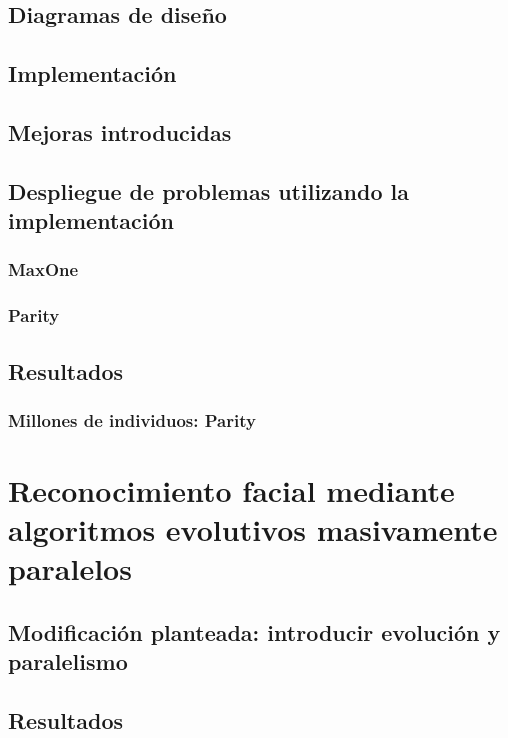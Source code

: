 \documentclass{estilos-y-libreria}
\begin{document}
	\section{Diagramas de dise\~no}
		
	\section{Implementaci\'on}
		
	\section{Mejoras introducidas}
		
	\section{Despliegue de problemas utilizando la implementaci\'on}
		
		\subsection{MaxOne}
			
		\subsection{Parity}
			
	\section{Resultados}
			
		\subsection{Millones de individuos: Parity}
				
			
\chapter{Reconocimiento facial mediante algoritmos evolutivos masivamente paralelos}		
	
	\section{Modificación planteada: introducir evolución y paralelismo}
		
	\section{Resultados}
		
\end{document}
